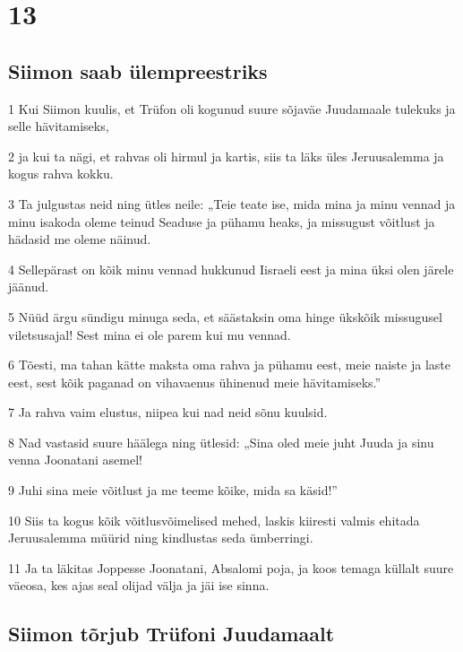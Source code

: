 \chapter{13}

\section*{Siimon saab ülempreestriks}

\par 1 Kui Siimon kuulis, et Trüfon oli kogunud suure sõjaväe Juudamaale tulekuks ja selle hävitamiseks,
\par 2 ja kui ta nägi, et rahvas oli hirmul ja kartis, siis ta läks üles Jeruusalemma ja kogus rahva kokku.
\par 3 Ta julgustas neid ning ütles neile: „Teie teate ise, mida mina ja minu vennad ja minu isakoda oleme teinud Seaduse ja pühamu heaks, ja missugust võitlust ja hädasid me oleme näinud.
\par 4 Sellepärast on kõik minu vennad hukkunud Iisraeli eest ja mina üksi olen järele jäänud.
\par 5 Nüüd ärgu sündigu minuga seda, et säästaksin oma hinge ükskõik missugusel viletsusajal! Sest mina ei ole parem kui mu vennad.
\par 6 Tõesti, ma tahan kätte maksta oma rahva ja pühamu eest, meie naiste ja laste eest, sest kõik paganad on vihavaenus ühinenud meie hävitamiseks.”
\par 7 Ja rahva vaim elustus, niipea kui nad neid sõnu kuulsid.
\par 8 Nad vastasid suure häälega ning ütlesid: „Sina oled meie juht Juuda ja sinu venna Joonatani asemel!
\par 9 Juhi sina meie võitlust ja me teeme kõike, mida sa käsid!”
\par 10 Siis ta kogus kõik võitlusvõimelised mehed, laskis kiiresti valmis ehitada Jeruusalemma müürid ning kindlustas seda ümberringi.
\par 11 Ja ta läkitas Joppesse Joonatani, Absalomi poja, ja koos temaga küllalt suure väeosa, kes ajas seal olijad välja ja jäi ise sinna. 

\section*{Siimon tõrjub Trüfoni Juudamaalt}

